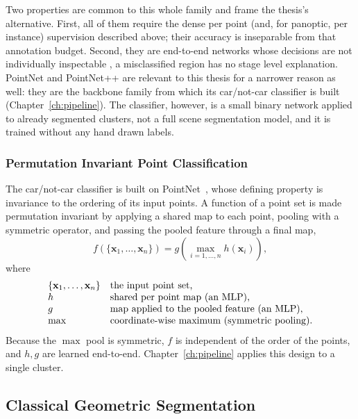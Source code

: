 \documentclass[a4paper,12pt]{report}
\begin{document}
Two properties are common to this whole family and frame the thesis's alternative.
First, all of them require the dense per point (and, for panoptic, per instance)
supervision described above; their accuracy is inseparable from that annotation budget.
Second, they are end-to-end networks whose decisions are not individually inspectable
, a misclassified region has no stage level explanation. PointNet and PointNet++ are
relevant to this thesis for a narrower reason as well: they are the backbone family from
which its car/not-car classifier is built (Chapter~\ref{ch:pipeline}). The classifier, however, is a
small binary network applied to already segmented clusters, not a full scene
segmentation model, and it is trained without any hand drawn labels.

\subsubsection{Permutation Invariant Point Classification}
\label{sec:th-pointnet}
The car/not-car classifier is built on PointNet~\cite{Qi_2017_CVPR}, whose defining property
is invariance to the ordering of its input points. A function of a point set is made
permutation invariant by applying a shared map to each point, pooling with a symmetric
operator, and passing the pooled feature through a final map,
\begin{equation}
  f(\{\mathbf{x}_1,\dots,\mathbf{x}_n\}) = g\!\left( \max_{i=1,\dots,n} h(\mathbf{x}_i) \right),
\end{equation}
where
\[
  \begin{array}{@{}l@{\quad}l@{}}
    \{\mathbf{x}_1,\dots,\mathbf{x}_n\} & \text{the input point set,}\\
    h & \text{shared per point map (an MLP),}\\
    g & \text{map applied to the pooled feature (an MLP),}\\
    \max & \text{coordinate-wise maximum (symmetric pooling).}
  \end{array}
\]
Because the $\max$ pool is symmetric, $f$ is independent of the order of the points, and
$h,g$ are learned end-to-end. Chapter~\ref{ch:pipeline} applies this design to a single
cluster.

\subsection{Classical Geometric Segmentation}
\label{sec:bg-classical}
\end{document}
